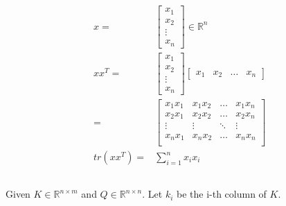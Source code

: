 \documentclass{article}
\newcommand{\RR}{\mathbb{R}}
\begin{document}
\subsection{}

\begin{align*}
    x = &
    \begin{bmatrix}
        x_1 \\ x_2 \\ \vdots \\ x_n
    \end{bmatrix}
    \in \RR ^n\\
    xx^T = &
    \begin{bmatrix}
        x_1 \\ x_2 \\ \vdots \\ x_n
    \end{bmatrix}
    \begin{bmatrix}
        x_1 & x_2 & \dots & x_n
    \end{bmatrix}\\
    = &
    \begin{bmatrix}
        x_1x_1 & x_1x_2 & \dots & x_1x_n\\
        x_2x_1 & x_2x_2 & \dots & x_2x_n \\
        \vdots & \vdots & \ddots& \vdots\\
        x_nx_1 & x_nx_2 & \dots & x_nx_n\\
    \end{bmatrix}\\
    tr(xx^T) = &
    \sum_{i=1}^n x_i x_i
\end{align*}

\subsection{}

Given $K\in \RR^{n\times m}$ and $Q\in \RR^{n \times n}$. Let $k_i$ be the i-th column of $K$.
\end{document}
